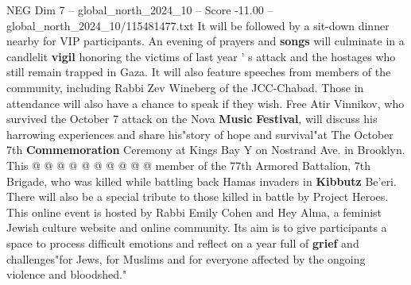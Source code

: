 \begin{textsample}{NEG Dim 7 – global\_north\_2024\_10 – Score -11.00 – global\_north\_2024\_10/115481477.txt}
It will be followed by a sit-down dinner nearby for VIP participants.
An evening of prayers and \textbf{songs} will culminate in a candlelit \textbf{vigil} honoring the victims of last year ' s attack and the hostages who still remain trapped in Gaza.
It will also feature speeches from members of the community, including Rabbi Zev Wineberg of the JCC-Chabad.
Those in attendance will also have a chance to speak if they wish.
Free Atir Vinnikov, who survived the October 7 attack on the Nova \textbf{Music} \textbf{Festival}, will discuss his harrowing experiences and share his"story of hope and survival"at The October 7th \textbf{Commemoration} Ceremony at Kings Bay Y on Nostrand Ave. in Brooklyn.
This @ @ @ @ @ @ @ @ @ @ member of the 77th Armored Battalion, 7th Brigade, who was killed while battling back Hamas invaders in \textbf{Kibbutz} Be'eri.
There will also be a special tribute to those killed in battle by Project Heroes.
This online event is hosted by Rabbi Emily Cohen and Hey Alma, a feminist Jewish culture website and online community.
Its aim is to give participants a space to process difficult emotions and reflect on a year full of \textbf{grief} and challenges"for Jews, for Muslims and for everyone affected by the ongoing violence and bloodshed."

\end{textsample}

